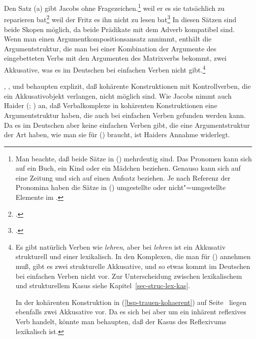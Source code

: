 Den Satz (a) gibt Jacobs ohne Fragezeichen.\footnote{%
\label{fn-scrambling-pronoun}%
        Man beachte, daß beide Sätze in () mehrdeutig sind.
        Das Pronomen  kann sich \zb auf ein Buch, ein Kind oder ein Mädchen beziehen.
        Genauso kann  sich auf eine Zeitung und  sich auf einen Aufsatz
        beziehen. Je nach Referenz der Pronomina haben die Sätze in ()
        umgestellte oder nicht"=umgestellte Elemente im \mf.%
}
\eal
\label{ex-coherent-bitten}
\ex
weil    er       es       sie       tatsächlich zu reparieren bat\label{bsp-er-es-sie-zu-reparieren-bat}\footnote{
        .
}
\ex{}
weil    der Fritz       es       ihn       nicht zu lesen bat\label{bsp-es-ihn-nicht-zu-lesen-bat}\footnote{
        .
}
\zl
In diesen Sätzen sind beide Skopen möglich, da beide Prädikate mit dem Adverb kompatibel sind.
Wenn man einen Argumentkompositionsansatz annimmt, enthält die Argumentstruktur, die man bei einer
Kombination der Argumente des eingebetteten Verbs mit den Argumenten des Matrixverbs bekommt,
zwei Akkusative, was es im Deutschen bei einfachen Verben nicht gibt.\footnote{
        Es gibt natürlich Verben wie \emph{lehren}, aber bei \emph{lehren} ist ein Akkusativ
        strukturell und einer lexikalisch. In den Komplexen, die man für () annehmen
        muß, gibt es zwei strukturelle Akkusative, und so etwas kommt im Deutschen bei einfachen
        Verben nicht vor. Zur Unterscheidung zwischen lexikalischem und strukturellem Kasus
        siehe Kapitel~\ref{sec-struc-lex-kas}.

        In der kohärenten Konstruktion in (\ref{bsp-trauen-kohaerent}) auf Seite~\pageref{bsp-trauen-kohaerent}
        liegen ebenfalls zwei Akkusative vor. Da es sich bei  aber um ein inhärent
        reflexives Verb handelt, könnte man behaupten, daß der Kasus
        des Reflexivums lexikalisch ist.%
}

\citet[]{BK89a}, \citet[]{Haider90b},
\citet[]{VS98a} und \citet[]{Abraham2005a}
behaupten explizit, daß kohärente Konstruktionen mit Kontrollverben, die ein Akkusativobjekt verlangen,
nicht möglich sind.
Wie Jacobs nimmt auch Haider (\citeyear[]{Haider86c}; \citeyear[]{Haider90b}) an,
daß Verbalkomplexe in kohärenten Konstruktionen eine Argumentstruktur haben, die auch bei
einfachen Verben gefunden werden kann. Da es im Deutschen aber keine einfachen Verben gibt,
die eine Argumentstruktur der Art haben, wie man sie für () braucht, ist Haiders Annahme
widerlegt.


